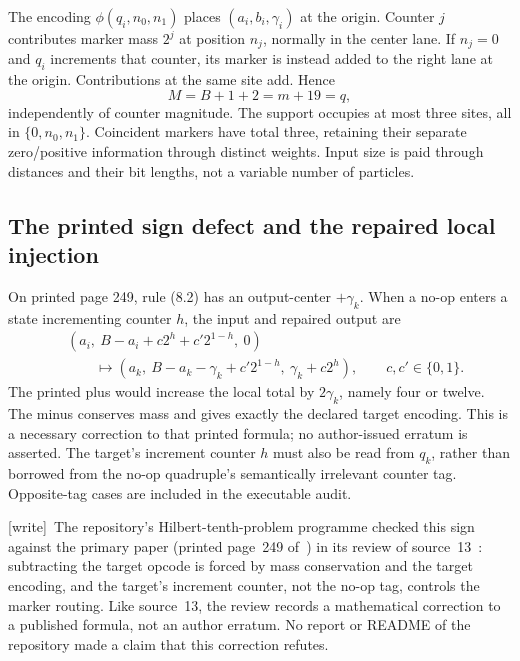 \documentclass[11pt,letterpaper]{article}
\numberwithin{equation}{section}
\theoremstyle{definition}
\theoremstyle{remark}
\newcommand{\wtag}{\textup{[write]}}
\begin{document}
The encoding $\phi(q_i,n_0,n_1)$ places $(a_i,b_i,\gamma_i)$ at the origin. Counter $j$ contributes marker mass $2^j$ at position $n_j$, normally in the center lane. If $n_j=0$ and $q_i$ increments that counter, its marker is instead added to the right lane at the origin. Contributions at the same site add. Hence
\begin{equation}\label{smc:sl:eq:source-mass}
 M=B+1+2=m+19=q,
\end{equation}
independently of counter magnitude. The support occupies at most three sites, all in $\{0,n_0,n_1\}$. Coincident markers have total three, retaining their separate zero/positive information through distinct weights. Input size is paid through distances and their bit lengths, not a variable number of particles.

\subsection{The printed sign defect and the repaired local injection}
On printed page 249, rule (8.2) has an output-center $+\gamma_k$. When a no-op enters a state incrementing counter $h$, the input and repaired output are
\begin{align}
 &(a_i,\ B-a_i+c2^h+c'2^{1-h},\ 0)\nonumber\\
 &\hspace{2em}\longmapsto
 (a_k,\ B-a_k-\gamma_k+c'2^{1-h},\ \gamma_k+c2^h),
 \qquad c,c'\in\{0,1\}.\label{smc:sl:eq:repair}
\end{align}
The printed plus would increase the local total by $2\gamma_k$, namely four or twelve. The minus conserves mass and gives exactly the declared target encoding. This is a necessary correction to that printed formula; no author-issued erratum is asserted. The target's increment counter $h$ must also be read from $q_k$, rather than borrowed from the no-op quadruple's semantically irrelevant counter tag. Opposite-tag cases are included in the executable audit.

\wtag\ The repository's Hilbert-tenth-problem programme checked this sign against the primary paper (printed page~249 of~\cite{moritaimai}) in its review of source~13~\cite{reviewsl}: subtracting the target opcode is forced by mass conservation and the target encoding, and the target's increment counter, not the no-op tag, controls the marker routing. Like source~13, the review records a mathematical correction to a published formula, not an author erratum. No report or README of the repository made a claim that this correction refutes.
\end{document}
